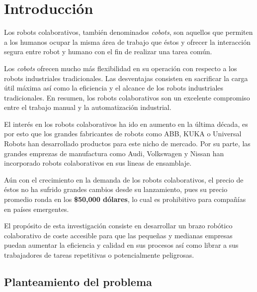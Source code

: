 \chapter{Introducción}

Los robots colaborativos, también denominados \textit{cobots}, son aquellos que permiten a los humanos ocupar la misma área de trabajo que éstos y ofrecer la interacción segura entre robot y humano con el fin de realizar una tarea común.  %

Los \textit{cobots} ofrecen mucho más flexibilidad en su operación con respecto a los robots industriales tradicionales. Las desventajas consisten en sacrificar la carga útil máxima así como la  eficiencia y el alcance de los robots industriales tradicionales. En resumen, los robots colaborativos son un excelente compromiso entre el trabajo manual y la automatización industrial. \cite{Zaatari2019} %

El interés en los robots colaborativos ha ido en aumento en la última década, es por esto que los grandes fabricantes de robots como ABB, KUKA o Universal Robots han desarrollado productos para este nicho de mercado. Por su parte, las grandes emprezas de manufactura como Audi, Volkswagen y Nissan han incorporado robots colaborativos en sus lineas de ensamblaje. \cite{Zaatari2019} %

Aún con el crecimiento en la demanda de los robots colaborativos, el precio de éstos no ha sufrido grandes cambios desde su lanzamiento, pues su precio promedio ronda en los \textbf{\$50,000 dólares}, lo cual es prohibitivo para compañías en países emergentes. %

El propósito de esta investigación consiste en desarrollar un brazo robótico colaborativo de coste accesible para que las pequeñas y medianas empresas puedan aumentar la eficiencia y calidad en sus procesos así como librar a sus trabajadores de tareas repetitivas o potencialmente peligrosas. %



\begin{comment}
Párrafo uno: Introducción sobre los robots colaborativos
Párrafo dos: Ventajas con respecto a robots tradicionales
Párrafo tres: Pertinencia de la investigación en la actualidad
Párrafo cuatro: Propósito de la investigación.
Párrafo cinco: Propósito de la investigación e interés social.
\end{comment}

\section{Planteamiento del problema}

